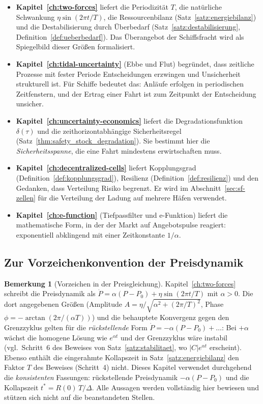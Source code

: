 \documentclass[a4paper, 12pt, twoside, openright]{report}
\theoremstyle{definition}
\theoremstyle{definition}
\newtheorem{bemerkung}{Bemerkung}[chapter]
\begin{document}
\begin{itemize}
  \item \textbf{Kapitel~\ref{ch:two-forces}} liefert die Periodizität $T$, die
    natürliche Schwankung $\eta\sin(2\pi t/T)$, die Ressourcenbilanz
    (Satz~\ref{satz:energiebilanz}) und die Destabilisierung durch Überbedarf
    (Satz~\ref{satz:destabilisierung}, Definition~\ref{def:ueberbedarf}). Das
    Überangebot der Schiffsfracht wird als Spiegelbild dieser Größen formalisiert.
  \item \textbf{Kapitel~\ref{ch:tidal-uncertainty}} (Ebbe und Flut) begründet, dass
    zeitliche Prozesse mit fester Periode Entscheidungen erzwingen und Unsicherheit
    strukturell ist. Für Schiffe bedeutet das: Anläufe erfolgen in periodischen
    Zeitfenstern, und der Ertrag einer Fahrt ist zum Zeitpunkt der Entscheidung
    unsicher.
  \item \textbf{Kapitel~\ref{ch:uncertainty-economics}} liefert die Degradationsfunktion
    $\delta(\tau)$ und die zeithorizontabhängige Sicherheitsregel
    (Satz~\ref{thm:safety_stock_degradation}). Sie bestimmt hier die
    \emph{Sicherheitsspanne}, die eine Fahrt mindestens erwirtschaften muss.
  \item \textbf{Kapitel~\ref{ch:decentralized-cells}} liefert Kopplungsgrad
    (Definition~\ref{def:kopplungsgrad}), Resilienz (Definition~\ref{def:resilienz})
    und den Gedanken, dass Verteilung Risiko begrenzt. Er wird im
    Abschnitt~\ref{sec:sf-zellen} für die Verteilung der Ladung auf mehrere Häfen
    verwendet.
  \item \textbf{Kapitel~\ref{ch:e-function}} (Tiefpassfilter und e-Funktion) liefert
    die mathematische Form, in der der Markt auf Angebotspulse reagiert: exponentiell
    abklingend mit einer Zeitkonstante $1/\alpha$.
\end{itemize}

\subsection{Zur Vorzeichenkonvention der Preisdynamik}

\begin{bemerkung}[Vorzeichen in der Preisgleichung]\label{bem:sf-vorzeichen}
Kapitel~\ref{ch:two-forces} schreibt die Preisdynamik als
$\dot P=\alpha(P-P_0)+\eta\sin(2\pi t/T)$ mit $\alpha>0$. Die dort angegebenen
Größen (Amplitude $A=\eta/\sqrt{\alpha^2+(2\pi/T)^2}$, Phase
$\phi=-\arctan(2\pi/(\alpha T))$) und die behauptete Konvergenz gegen den Grenzzyklus
gelten für die \emph{rückstellende} Form $\dot P=-\alpha(P-P_0)+\dots$: Bei $+\alpha$
wächst die homogene Lösung wie $e^{\alpha t}$ und der Grenzzyklus wäre instabil
(vgl.\ Schritt~6 des Beweises von Satz~\ref{satz:stabilitaet}, wo $|C|e^{\alpha t}$
erscheint). Ebenso enthält die eingerahmte Kollapszeit in
Satz~\ref{satz:energiebilanz} den Faktor $T$ des Beweises (Schritt~4) nicht. Dieses
Kapitel verwendet durchgehend die \emph{konsistenten} Fassungen:
rückstellende Preisdynamik $-\alpha(P-P_0)$ und die Kollapszeit $t^*=R(0)\,T/\Delta$.
Alle Aussagen werden vollständig hier bewiesen und stützen sich nicht auf die
beanstandeten Stellen.
\end{bemerkung}
\end{document}
